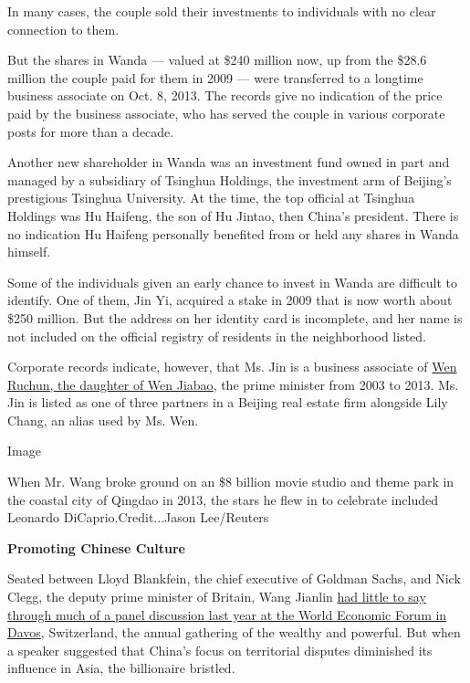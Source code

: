 In many cases, the couple sold their investments to individuals with no
clear connection to them.

But the shares in Wanda --- valued at \$240 million now, up from the
\$28.6 million the couple paid for them in 2009 --- were transferred to
a longtime business associate on Oct. 8, 2013. The records give no
indication of the price paid by the business associate, who has served
the couple in various corporate posts for more than a decade.

Another new shareholder in Wanda was an investment fund owned in part
and managed by a subsidiary of Tsinghua Holdings, the investment arm of
Beijing's prestigious Tsinghua University. At the time, the top official
at Tsinghua Holdings was Hu Haifeng, the son of Hu Jintao, then China's
president. There is no indication Hu Haifeng personally benefited from
or held any shares in Wanda himself.

Some of the individuals given an early chance to invest in Wanda are
difficult to identify. One of them, Jin Yi, acquired a stake in 2009
that is now worth about \$250 million. But the address on her identity
card is incomplete, and her name is not included on the official
registry of residents in the neighborhood listed.

Corporate records indicate, however, that Ms. Jin is a business
associate of
\href{http://www.nytimes3xbfgragh.onion/2012/10/26/business/global/family-of-wen-jiabao-holds-a-hidden-fortune-in-china.html}{Wen
Ruchun, the daughter of Wen Jiabao}, the prime minister from 2003 to
2013. Ms. Jin is listed as one of three partners in a Beijing real
estate firm alongside Lily Chang, an alias used by Ms. Wen.

Image

When Mr. Wang broke ground on an \$8 billion movie studio and theme park
in the coastal city of Qingdao in 2013, the stars he flew in to
celebrate included Leonardo DiCaprio.Credit...Jason Lee/Reuters

\textbf{Promoting Chinese Culture}

Seated between Lloyd Blankfein, the chief executive of Goldman Sachs,
and Nick Clegg, the deputy prime minister of Britain, Wang Jianlin
\href{http://dealbook.nytimes3xbfgragh.onion/2014/01/23/bristling-interrupts-amity-in-panel-on-u-s-china-europe-ties/}{had
little to say through much of a panel discussion last year at the World
Economic Forum in Davos}, Switzerland, the annual gathering of the
wealthy and powerful. But when a speaker suggested that China's focus on
territorial disputes diminished its influence in Asia, the billionaire
bristled.

